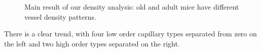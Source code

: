 \documentclass[
  letterpaper,
  DIV=11,
  numbers=noendperiod,
  oneside]{scrartcl}
\theoremstyle{plain}
\theoremstyle{remark}
\begin{document}
\begin{figure}


\caption{\label{fig-density-effects-detail}Main result of our density
analysis: old and adult mice have different vessel density patterns.}

\end{figure}%

There is a clear trend, with four low order capillary types separated
from zero on the left and two high order types separated on the right.
\end{document}
